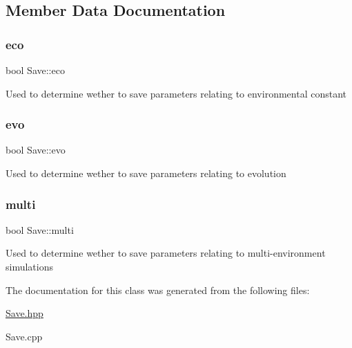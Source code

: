 \subsection{Member Data Documentation}
\hypertarget{classSave_a1305b08b2fd9b8fd4add77e3effb594f}{}\label{classSave_a1305b08b2fd9b8fd4add77e3effb594f} 
\subsubsection{\texorpdfstring{eco}{eco}}
{\footnotesize\ttfamily bool Save\+::eco\hspace{0.3cm}{\ttfamily [protected]}}

Used to determine wether to save parameters relating to environmental constant \hypertarget{classSave_abaa66610fa9870f1e400a58b8732a996}{}\label{classSave_abaa66610fa9870f1e400a58b8732a996} 
\subsubsection{\texorpdfstring{evo}{evo}}
{\footnotesize\ttfamily bool Save\+::evo\hspace{0.3cm}{\ttfamily [protected]}}

Used to determine wether to save parameters relating to evolution \hypertarget{classSave_ad1d9db0d8c003efe9e29c497091771e6}{}\label{classSave_ad1d9db0d8c003efe9e29c497091771e6} 
\subsubsection{\texorpdfstring{multi}{multi}}
{\footnotesize\ttfamily bool Save\+::multi\hspace{0.3cm}{\ttfamily [protected]}}

Used to determine wether to save parameters relating to multi-\/environment simulations 

The documentation for this class was generated from the following files\+:\begin{DoxyCompactItemize}
\item 
\hyperlink{Save_8hpp}{Save.\+hpp}\item 
Save.\+cpp\end{DoxyCompactItemize}
